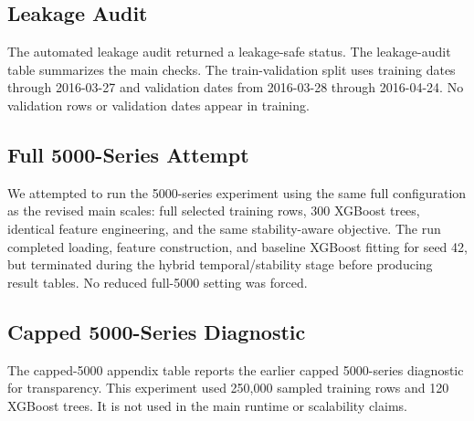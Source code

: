 \documentclass[10pt,conference]{IEEEtran}
\begin{document}
\subsection{Leakage Audit}
The automated leakage audit returned a leakage-safe status. The leakage-audit table summarizes the main checks. The train-validation split uses training dates through 2016-03-27 and validation dates from 2016-03-28 through 2016-04-24. No validation rows or validation dates appear in training.

\begin{table}[!t]
\centering
\caption{Summary of automated leakage audit checks.}
\label{tab:leakage_audit_summary}
\scriptsize
{}
\end{table}

\subsection{Full 5000-Series Attempt}
We attempted to run the 5000-series experiment using the same full configuration as the revised main scales: full selected training rows, 300 XGBoost trees, identical feature engineering, and the same stability-aware objective. The run completed loading, feature construction, and baseline XGBoost fitting for seed 42, but terminated during the hybrid temporal/stability stage before producing result tables. No reduced full-5000 setting was forced.

\subsection{Capped 5000-Series Diagnostic}
The capped-5000 appendix table reports the earlier capped 5000-series diagnostic for transparency. This experiment used 250,000 sampled training rows and 120 XGBoost trees. It is not used in the main runtime or scalability claims.
\end{document}
